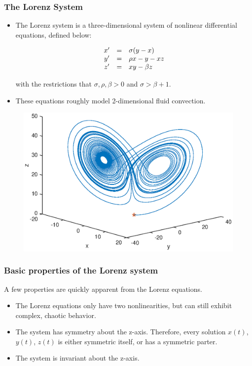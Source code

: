 \documentclass{beamer}
\begin{document}
\begin{frame}
    \frametitle{The Lorenz System}

    \begin{itemize}
        \item{The Lorenz system is a three-dimensional system of nonlinear differential equations, defined below:}

        \begin{equation}
            \begin{array}{c c l}
                x' & = & \sigma(y - x) \\
                y' & = & \rho x - y - xz \\
                z' & = & xy - \beta z
            \end{array} 
        \end{equation}

        with the restrictions that $\sigma, \rho, \beta > 0$ and $\sigma > \beta + 1$.

        \item{These equations roughly model 2-dimensional fluid convection.}
    \end{itemize}
    \begin{figure}
        \includegraphics[width=0.4\linewidth]{r28}
    \end{figure}

\end{frame}


\begin{frame}
    \frametitle{Basic properties of the Lorenz system}

    A few properties are quickly apparent from the Lorenz equations.

    \bigskip

    \begin{itemize}
        \item{The Lorenz equations only have two nonlinearities, but can still exhibit complex, chaotic behavior.}
        \item{The system has symmetry about the z-axis. Therefore, every solution $x(t)$, $y(t)$, $z(t)$ is either symmetric itself, or has a symmetric parter.}
        \item{The system is invariant about the z-axis.}
    \end{itemize}

\end{frame}
\end{document}
